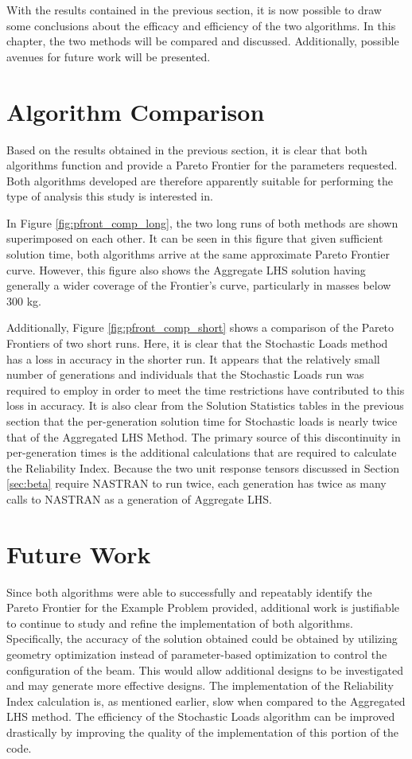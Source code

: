 With the results contained in the previous section, it is now possible to draw some conclusions about the efficacy and efficiency of the two algorithms. In this chapter, the two methods will be compared and discussed. Additionally, possible avenues for future work will be presented.  

\section{Algorithm Comparison}
Based on the results obtained in the previous section, it is clear that both algorithms function and provide a Pareto Frontier for the parameters requested. Both algorithms developed are therefore apparently suitable for performing the type of analysis this study is interested in.

In Figure \ref{fig:pfront_comp_long}, the two long runs of both methods are shown superimposed on each other. It can be seen in this figure that given sufficient solution time, both algorithms arrive at the same approximate Pareto Frontier curve. However, this figure also shows the Aggregate LHS solution having generally a wider coverage of the Frontier's curve, particularly in masses below 300 kg. 

Additionally, Figure \ref{fig:pfront_comp_short} shows a comparison of the Pareto Frontiers of two short runs. Here, it is clear that the Stochastic Loads method has a loss in accuracy in the shorter run. It appears that the relatively small number of generations and individuals that the Stochastic Loads run was required to employ in order to meet the time restrictions have contributed to this loss in accuracy. It is also clear from the Solution Statistics tables in the previous section that the per-generation solution time for Stochastic loads is nearly twice that of the Aggregated LHS Method. The primary source of this discontinuity in per-generation times is the additional calculations that are required to calculate the Reliability Index. Because the two unit response tensors discussed in Section \ref{sec:beta} require NASTRAN to run twice, each generation has twice as many calls to NASTRAN as a generation of Aggregate LHS. 

\section{Future Work}
Since both algorithms were able to successfully and repeatably identify the Pareto Frontier for the Example Problem provided, additional work is justifiable to continue to study and refine the implementation of both algorithms. Specifically, the accuracy of the solution obtained could be obtained by utilizing geometry optimization instead of parameter-based optimization to control the configuration of the beam. This would allow additional designs to be investigated and may generate more effective designs. The implementation of the Reliability Index calculation is, as mentioned earlier, slow when compared to the Aggregated LHS method. The efficiency of the Stochastic Loads algorithm can be improved drastically by improving the quality of the implementation of this portion of the code. 
